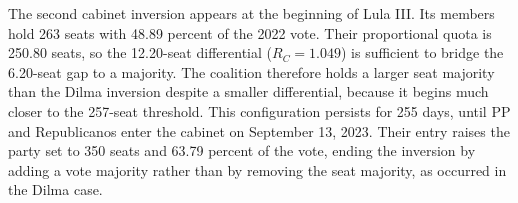 \documentclass[11pt]{article}
\begin{document}


The second cabinet inversion appears at the beginning of Lula III. Its members
hold 263 seats with 48.89 percent of the 2022 vote. Their proportional quota is
250.80 seats, so the 12.20-seat differential (\(R_C=1.049\)) is sufficient to
bridge the 6.20-seat gap to a majority. The coalition therefore holds a larger
seat majority than the Dilma inversion despite a smaller differential, because
it begins much closer to the 257-seat threshold. This configuration persists
for 255 days, until PP and Republicanos enter the cabinet on September 13,
2023. Their entry raises the party set to 350 seats and 63.79 percent of the
vote, ending the inversion by adding a vote majority rather than by removing
the seat majority, as occurred in the Dilma case.
\end{document}
